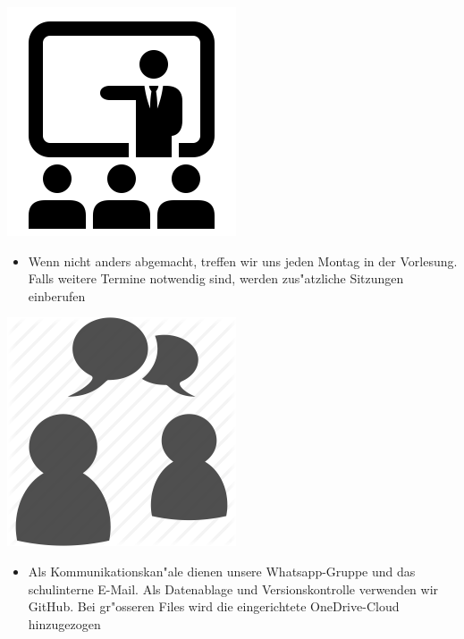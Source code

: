 \documentclass[12pt]{article}
\begin{document}
\begin{center}
\includegraphics[scale=0.3]{lecture}\\
\end{center}

\begin{itemize}
\item Wenn nicht anders abgemacht, treffen wir uns jeden Montag in der Vorlesung. Falls weitere Termine notwendig sind, werden zus"atzliche Sitzungen einberufen \\
\end{itemize}

\begin{center}
\includegraphics[scale=0.25]{communication}\\
\end{center}

\begin{itemize}
\item Als Kommunikationskan"ale dienen unsere Whatsapp-Gruppe und das schulinterne E-Mail. Als Datenablage und Versionskontrolle verwenden wir GitHub. Bei gr"osseren Files wird die eingerichtete OneDrive-Cloud hinzugezogen\\\\
\end{itemize}
\end{document}
